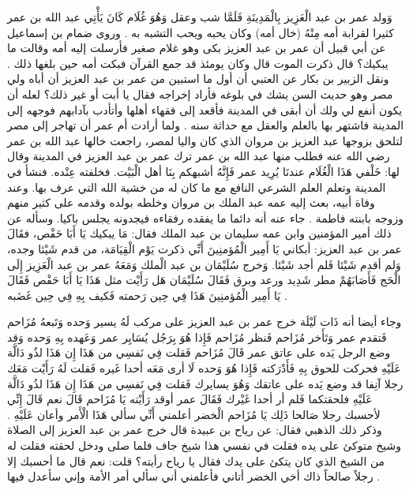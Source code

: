 وَولد عمر بن عبد الْعَزِيز بِالْمَدِينَةِ فَلَمَّا شب وعقل وَهُوَ غُلَام كَانَ يَأْتِي عبد الله بن عمر كثيرا لقرابة أمه مِنْهُ (خال أمه) وكان يحبه ويحب التشبه به \cite{ibnAbdAlHakam_OmarIbnAbdAlAziz}. وروى ضمام بن إسماعيل عن أبي قبيل أن عمر بن عبد العزيز بكى وهو غلام صغير فأرسلت إليه أمه وقالت ما يبكيك؟ قال ذكرت الموت قال وكان يومئذ قد جمع القرآن فبكت أمه حين بلغها ذلك \cite{dahabi_Siyar}. ونقل الزبير بن بكار عن العتبي أن أول ما استبين من عمر بن عبد العزيز أن أباه ولي مصر وهو حديث السن يشك في بلوغه فأراد إخراجه فقال يا أبت أو غير ذلك؟ لعله أن يكون أنفع لي ولك أن أبقى في المدينة فأقعد إلى فقهاء أهلها وأتأدب بآدابهم فوجهه إلى المدينة فاشتهر بها بالعلم والعقل مع حداثة سنه \cite{dahabi_Siyar}. ولما أرادت أم عمر أن تهاجر إلى مصر لتلحق بزوجها عبد العزيز بن مروان الذي كان واليا لمصر، راجعت خالها عبد الله بن عمر رضي الله عنه فطلب منها عبد الله بن عمر ترك عمر بن عبد العزيز في المدينة وقال لها: خَلْفي هَذَا الْغُلَام عندنَا يُرِيد عمر فَإِنَّهُ أشبهكم بِنَا أهل الْبَيْت. فخلفته عِنْده. فنشأ في المدينة وتعلم العلم الشرعي النافع مع ما كان له من خشية الله التي عرف بها. وعند وفاة أبيه، بعث إليه عمه عبد الملك بن مروان وخلطه بولده وقدمه على كثير منهم وزوجه بابنته فاطمة \cite{dahabi_Siyar}. جاء عنه أنه دائما ما يفقده رفقاءه فيجدونه يجلس باكيا. وسأله عن ذلك أمير المؤمنين وابن عمه سليمان بن عبد الملك فقال: مَا يبكيك يَا أَبَا حَفْص، فقَالَ عمر بن عبد العزيز: أبكاني يَا أَمِير الْمُؤمنِينَ أَنِّي ذكرت يَوْم الْقِيَامَة، من قدم شَيْئا وجده، وَلم أقدم شَيْئا فَلم أجد شَيْئا. وَخرج سُلَيْمَان بن عبد الْملك وَمَعَهُ عمر بن عبد الْعَزِيز إِلَى الْحَج فَأَصَابَهُمْ مطر شَدِيد ورعد وبرق فَقَالَ سُلَيْمَان هَل رَأَيْت مثل هَذَا يَا أَبَا حَفْص فَقَالَ يَا أَمِير الْمُؤمنِينَ هَذَا فِي حِين رَحمته فَكيف بِهِ فِي حِين غَضَبه \cite{ibnAbdAlHakam_OmarIbnAbdAlAziz}. 

وجاء أيضا أنه ذَات لَيْلَة خرج عمر بن عبد العزيز على مركب لَهُ يسير وَحده وَتَبعهُ مُزَاحم فَتقدم عمر وَتَأَخر مُزَاحم فَنظر مُزَاحم فَإِذا هُوَ بِرَجُل يُسَايِر عمر وَعَهده بِهِ وَحده وَقد وضع الرجل يَده على عاتق عمر قَالَ مُزَاحم فَقلت فِي نَفسِي من هَذَا إِن هَذَا لذُو دَالَّة عَلَيْهِ فحركت للحوق بِهِ فَأَدْرَكته فَإِذا هُوَ وَحده لَا أرى مَعَه أحدا غَيره فَقلت لَهُ رَأَيْت مَعَك رجلا آنِفا قد وضع يَده على عاتقك وَهُوَ يسايرك فَقلت فِي نَفسِي من هَذَا إِن هَذَا لذُو دَالَّة عَلَيْهِ فلحقتكما فَلم أر أحدا غَيْرك فَقَالَ عمر أوقد رَأَيْته يَا مُزَاحم قَالَ نعم قَالَ إِنِّي لأحسبك رجلا صَالحا ذَلِك يَا مُزَاحم الْخضر أعلمني أَنِّي سألي هَذَا الْأَمر وأعان عَلَيْهِ \cite{ibnAbdAlHakam_OmarIbnAbdAlAziz}. وذكر ذلك الذهبي فقال:  عن رياح بن عبيدة قال خرج عمر بن عبد العزيز إلى الصلاة وشيخ متوكئ على يده فقلت في نفسي هذا شيخ جاف فلما صلى ودخل لحقته فقلت له من الشيخ الذي كان يتكئ على يدك فقال يا رياح رأيته؟ قلت: نعم قال ما أحسبك إلا رجلاً صالحاً ذاك أخي الخضر أتاني فأعلمني أني سألي أمر الأمة وإني سأعدل فيها \cite{dahabi_Siyar}.

